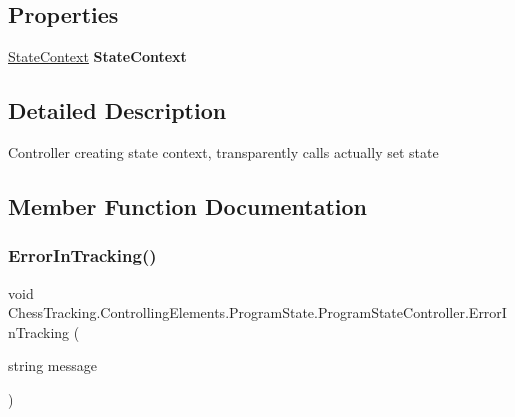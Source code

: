 \subsection*{Properties}
\begin{DoxyCompactItemize}
\item 
\mbox{\label{class_chess_tracking_1_1_controlling_elements_1_1_program_state_1_1_program_state_controller_a05e055cc7226f1158e8df5fae88efd70}} 
\mbox{\hyperlink{class_chess_tracking_1_1_controlling_elements_1_1_program_state_1_1_state_context}{State\+Context}} {\bfseries State\+Context}
\end{DoxyCompactItemize}


\subsection{Detailed Description}
Controller creating state context, transparently calls actually set state 



\subsection{Member Function Documentation}
\mbox{\label{class_chess_tracking_1_1_controlling_elements_1_1_program_state_1_1_program_state_controller_adff6e8fc8dff0a594286ae35b59d416c}} 
\subsubsection{\texorpdfstring{ErrorInTracking()}{ErrorInTracking()}}
{\footnotesize\ttfamily void Chess\+Tracking.\+Controlling\+Elements.\+Program\+State.\+Program\+State\+Controller.\+Error\+In\+Tracking (\begin{DoxyParamCaption}\item[{string}]{message }\end{DoxyParamCaption})}




